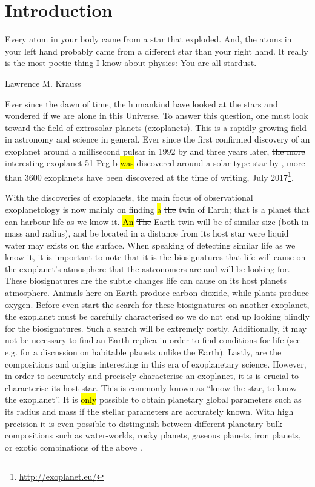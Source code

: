 \chapter{Introduction}
\label{cha:introduction}
\epigraph{Every atom in your body came from a star that exploded. And, the atoms in your left hand
          probably came from a different star than your right hand. It really is the most poetic
          thing I know about physics: You are all stardust.}{Lawrence M. Krauss}

Ever since the dawn of time, the humankind have looked at the stars and wondered if we are alone in
this Universe. To answer this question, one must look toward the field of extrasolar planets
(exoplanets). This is a rapidly growing field in astronomy and science in general. Ever since the
first confirmed discovery of an exoplanet around a millisecond pulsar in 1992 by
\citet{Wolszczan1992} and three years later, \st{the more interesting} exoplanet 51 Peg b \hl{was}
discovered around a solar-type star by \citet{Mayor1995}, more than 3600 exoplanets have been
discovered at the time of writing, July 2017\footnote{\url{http://exoplanet.eu/}}.

With the discoveries of exoplanets, the main focus of observational exoplanetology is now mainly on
finding \hl{a} \st{the} twin of Earth; that is a planet that can harbour life as we know it. \hl{An}
\st{The} Earth twin will be of similar size (both in mass and radius), and be located in a distance
from its host star were liquid water may exists on the surface. When speaking of detecting similar
life as we know it, it is important to note that it is the biosignatures that life will cause on the
exoplanet's atmosphere that the astronomers are and will be looking for. These biosignatures are the
subtle changes life can cause on its host planets atmosphere. Animals here on Earth produce
carbon-dioxide, while plants produce oxygen. Before even start the search for these biosignatures on
another exoplanet, the exoplanet must be carefully characterised so we do not end up looking blindly
for the biosignatures. Such a search will be extremely costly. Additionally, it may not be necessary
to find an Earth replica in order to find conditions for life (see e.g. \citet{Alibert2014} for a
discussion on habitable planets unlike the Earth). Lastly, are the compositions and origins
interesting in this era of exoplanetary science. However, in order to accurately and precisely
characterise an exoplanet, it is is crucial to characterise its host star. This is commonly known as
``know the star, to know the exoplanet''. It is \hl{only} possible to obtain planetary global
parameters such as its radius and mass if the stellar parameters are accurately known. With high
precision it is even possible to distinguish between different planetary bulk compositions such as
water-worlds, rocky planets, gaseous planets, iron planets, or exotic combinations of the above
\citep[see e.g.][]{Thiabaud2014,Dorn2015}.

